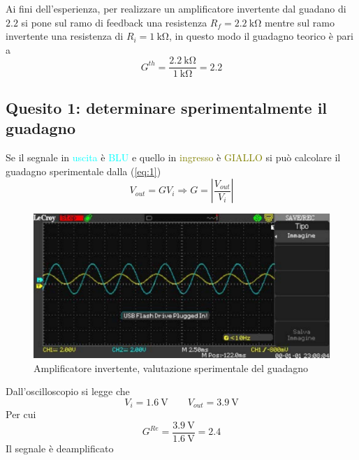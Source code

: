 \documentclass[a4paper, 12pt, twoside]{report}
\begin{document}
	\begin{figure}[H]
		\centering
		 \quad {}
	\end{figure}
	
	
\newpage

Ai fini dell'esperienza, per realizzare un amplificatore invertente dal guadano di $2.2$ si pone sul ramo di feedback una resistenza $R_f = \SI{2.2}{\kilo\ohm}$ mentre sul ramo invertente una resistenza di $R_i = \SI{1}{\kilo\ohm}$, in questo modo il guadagno teorico è pari a 
\[G^{th} = \dfrac{\SI{2.2}{\kilo\ohm}}{\SI{1}{\kilo\ohm}} = 2.2\]

\subsection{Quesito 1: determinare sperimentalmente il guadagno}
Se il segnale in \textcolor{cyan}{uscita} è \textcolor{cyan}{BLU} e quello in \textcolor{olive}{ingresso} è \textcolor{olive}{GIALLO} si può calcolare il guadagno sperimentale dalla (\ref{eq:1})
\[V_{out} = GV_i \Rightarrow G = \left|\dfrac{V_{out}}{V_i}\right|\]	
\begin{figure}[H]
	\centering
	\includegraphics[width=0.7\linewidth]{imag/WA000017}
	\caption{Amplificatore invertente, valutazione sperimentale del guadagno}
	\label{fig:wa000017}
\end{figure}
Dall'oscilloscopio si legge che 
\[V_i = \SI{1.6}{\volt} \qquad V_{out} = \SI{3.9}{\volt}\]
Per cui 
\[G^{Re} = \dfrac{\SI{3.9}{\volt}}{\SI{1.6}{\volt}} = 2.4\]
Il segnale è deamplificato
\end{document}
